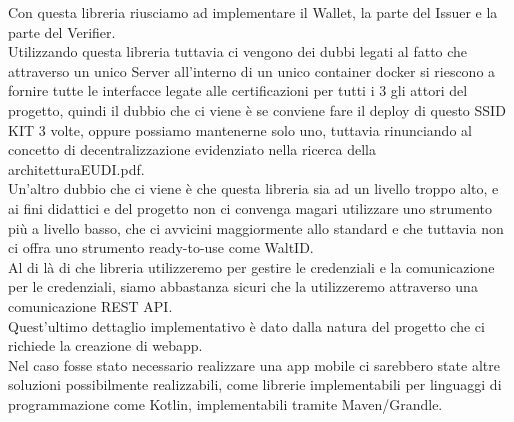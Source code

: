 Con questa libreria riusciamo ad implementare il Wallet, la parte del Issuer e la parte del Verifier.\\
Utilizzando questa libreria tuttavia ci vengono dei dubbi legati al fatto che attraverso un unico Server all'interno di un unico container docker si riescono a fornire tutte le 
interfacce legate alle certificazioni per tutti i 3 gli attori del progetto, quindi il dubbio che ci viene è se conviene fare il deploy di questo
SSID KIT 3 volte, oppure possiamo mantenerne solo uno, tuttavia rinunciando al concetto di decentralizzazione evidenziato nella ricerca
della architetturaEUDI.pdf.\\
Un'altro dubbio che ci viene è che questa libreria sia ad un livello troppo alto, e ai fini didattici e del progetto non ci convenga magari 
utilizzare uno strumento più a livello basso, che ci avvicini maggiormente allo standard e che tuttavia non ci offra uno strumento ready-to-use come WaltID.\\
Al di là di che libreria utilizzeremo per gestire le credenziali e la comunicazione per le credenziali, siamo abbastanza sicuri che la
utilizzeremo attraverso una comunicazione REST API.\\
Quest'ultimo dettaglio implementativo è dato dalla natura del progetto che ci richiede la creazione di webapp.\\
Nel caso fosse stato necessario realizzare
una app mobile ci sarebbero state altre soluzioni possibilmente realizzabili, come librerie implementabili per linguaggi di programmazione come Kotlin, implementabili tramite Maven/Grandle.\\


